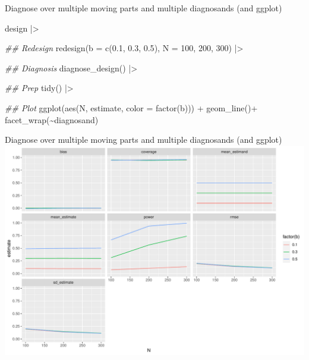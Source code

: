 \documentclass[
  11pt,
  ignorenonframetext,
]{beamer}
\newenvironment{Shaded}{\begin{snugshade}}{\end{snugshade}}
\newcommand{\AttributeTok}[1]{\textcolor[rgb]{0.40,0.45,0.13}{#1}}
\newcommand{\DecValTok}[1]{\textcolor[rgb]{0.68,0.00,0.00}{#1}}
\newcommand{\DocumentationTok}[1]{\textcolor[rgb]{0.37,0.37,0.37}{\textit{#1}}}
\newcommand{\FloatTok}[1]{\textcolor[rgb]{0.68,0.00,0.00}{#1}}
\newcommand{\FunctionTok}[1]{\textcolor[rgb]{0.28,0.35,0.67}{#1}}
\newcommand{\NormalTok}[1]{\textcolor[rgb]{0.00,0.23,0.31}{#1}}
\newcommand{\SpecialCharTok}[1]{\textcolor[rgb]{0.37,0.37,0.37}{#1}}
\begin{document}
\begin{frame}[fragile]{Diagnose over multiple moving parts and multiple
diagnosands (and ggplot)}
\protect\hypertarget{diagnose-over-multiple-moving-parts-and-multiple-diagnosands-and-ggplot}{}
\begin{Shaded}
\begin{Highlighting}[]
\NormalTok{design }\SpecialCharTok{|\textgreater{}}

  \DocumentationTok{\#\# Redesign}
  \FunctionTok{redesign}\NormalTok{(}\AttributeTok{b =} \FunctionTok{c}\NormalTok{(}\FloatTok{0.1}\NormalTok{, }\FloatTok{0.3}\NormalTok{, }\FloatTok{0.5}\NormalTok{), }\AttributeTok{N =} \DecValTok{100}\NormalTok{, }\DecValTok{200}\NormalTok{, }\DecValTok{300}\NormalTok{) }\SpecialCharTok{|\textgreater{}}
  
  \DocumentationTok{\#\# Diagnosis}
  \FunctionTok{diagnose\_design}\NormalTok{() }\SpecialCharTok{|\textgreater{}}
  
  \DocumentationTok{\#\# Prep}
  \FunctionTok{tidy}\NormalTok{() }\SpecialCharTok{|\textgreater{}}
  
  \DocumentationTok{\#\# Plot}
  \FunctionTok{ggplot}\NormalTok{(}\FunctionTok{aes}\NormalTok{(N, estimate, }\AttributeTok{color =} \FunctionTok{factor}\NormalTok{(b))) }\SpecialCharTok{+}
  \FunctionTok{geom\_line}\NormalTok{()}\SpecialCharTok{+}
  \FunctionTok{facet\_wrap}\NormalTok{(}\SpecialCharTok{\textasciitilde{}}\NormalTok{diagnosand)}
\end{Highlighting}
\end{Shaded}
\end{frame}

\begin{frame}{Diagnose over multiple moving parts and multiple
diagnosands (and ggplot)}
\protect\hypertarget{diagnose-over-multiple-moving-parts-and-multiple-diagnosands-and-ggplot-1}{}
\includegraphics{0_lectures_files/figure-beamer/unnamed-chunk-455-1.pdf}
\end{frame}
\end{document}
